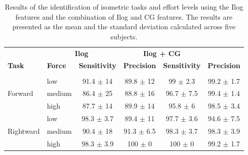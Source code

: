 \begin{table}[h!]
\centering
\caption{Results of the identification of isometric tasks and effort levels using the Ilog features and the combination of Ilog and CG features. The results are presented as the mean and the standard deviation calculated across five subjects.}
\label{tb:4-2}
\begin{tabular}{llcccc}
              & \multicolumn{2}{c}{\textbf{Ilog}}                            & \multicolumn{2}{c}{\textbf{Ilog + CG}}                       \\
\textbf{Task} & \textbf{Force} & \textbf{Sensitivity}                          & \textbf{Precision}                           & \textbf{Sensitivity}                         & \textbf{Precision}                          \\ \hline
              &                &                                               &                                              &                                             &                                             \\
              & low            & 91.4 $\pm$ 14                                 & 89.8 $\pm$ 12                                & 99 $\pm$ 2.3                                & 99.2 $\pm$ 1.7                              \\
Forward       & medium         & 86.4 $\pm$ 25                                 & 88.8 $\pm$ 16                                & 96.7 $\pm$ 7.5                              & 99.4 $\pm$ 1.4                              \\
              & high           & 87.7 $\pm$ 14                                 & 89.9 $\pm$ 14                                & 95.8 $\pm$ 6                                & 98.5 $\pm$ 3.4                              \\ \hline
              & low            & 98.3 $\pm$ 3.7                                & 89.4 $\pm$ 11                                & 97.7 $\pm$ 3.6                              & 94.6 $\pm$ 7.5                              \\
Rightward     & medium         & 90.4 $\pm$ 18                                 & 91.3 $\pm$ 6.5                               & 98.3 $\pm$ 3.7                              & 98.3 $\pm$ 3.9                              \\
              & high           & 98.3 $\pm$ 3.9                                & 100 $\pm$ 0                                  & 100 $\pm$ 0                                 & 99.2 $\pm$ 1.7                              \\ \hline

\end{tabular}
\end{table}
